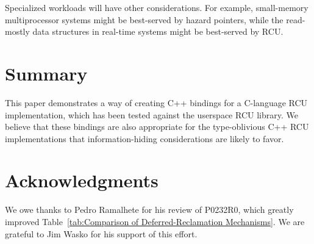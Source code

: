 \documentclass[letterpaper,twocolumn,10pt]{article}
\begin{document}
Specialized workloads will have other considerations.
For example, small-memory multiprocessor systems might be best-served by
hazard pointers, while the read-mostly data structures in real-time
systems might be best-served by RCU.

\section{Summary}
\label{sec:Summary}

This paper demonstrates a way of creating C++ bindings for a C-language
RCU implementation, which has been tested against the userspace RCU
library.
We believe that these bindings are also appropriate for the type-oblivious
C++ RCU implementations that information-hiding considerations are likely
to favor.

\section*{Acknowledgments}

We owe thanks to Pedro Ramalhete for his review of P0232R0, which
greatly improved
Table~\ref{tab:Comparison of Deferred-Reclamation Mechanisms}.
We are grateful to Jim Wasko for his support of this effort.

%
%

%







\end{document}
